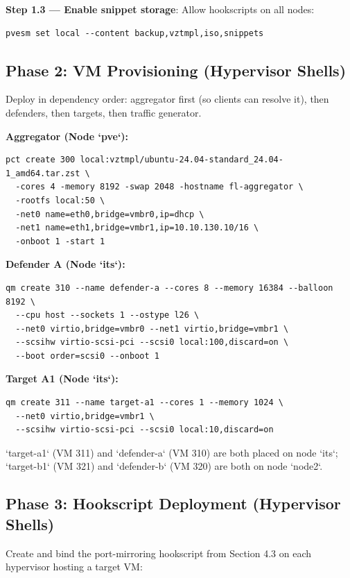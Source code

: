 \documentclass[conference]{IEEEtran}
\begin{document}
\textbf{Step 1.3 — Enable snippet storage}: Allow hookscripts on all nodes:

\begin{verbatim}
pvesm set local --content backup,vztmpl,iso,snippets
\end{verbatim}


\subsection{Phase 2: VM Provisioning (Hypervisor Shells)}

Deploy in dependency order: aggregator first (so clients can resolve it), then defenders, then targets, then traffic generator.

\textbf{Aggregator (Node `pve`):}

\begin{verbatim}
pct create 300 local:vztmpl/ubuntu-24.04-standard_24.04-1_amd64.tar.zst \
  -cores 4 -memory 8192 -swap 2048 -hostname fl-aggregator \
  -rootfs local:50 \
  -net0 name=eth0,bridge=vmbr0,ip=dhcp \
  -net1 name=eth1,bridge=vmbr1,ip=10.10.130.10/16 \
  -onboot 1 -start 1
\end{verbatim}

\textbf{Defender A (Node `its`):}

\begin{verbatim}
qm create 310 --name defender-a --cores 8 --memory 16384 --balloon 8192 \
  --cpu host --sockets 1 --ostype l26 \
  --net0 virtio,bridge=vmbr0 --net1 virtio,bridge=vmbr1 \
  --scsihw virtio-scsi-pci --scsi0 local:100,discard=on \
  --boot order=scsi0 --onboot 1
\end{verbatim}

\textbf{Target A1 (Node `its`):}

\begin{verbatim}
qm create 311 --name target-a1 --cores 1 --memory 1024 \
  --net0 virtio,bridge=vmbr1 \
  --scsihw virtio-scsi-pci --scsi0 local:10,discard=on
\end{verbatim}

`target-a1` (VM 311) and `defender-a` (VM 310) are both placed on node `its`; `target-b1` (VM 321) and `defender-b` (VM 320) are both on node `node2`.


\subsection{Phase 3: Hookscript Deployment (Hypervisor Shells)}

Create and bind the port-mirroring hookscript from Section 4.3 on each hypervisor hosting a target VM:
\end{document}
